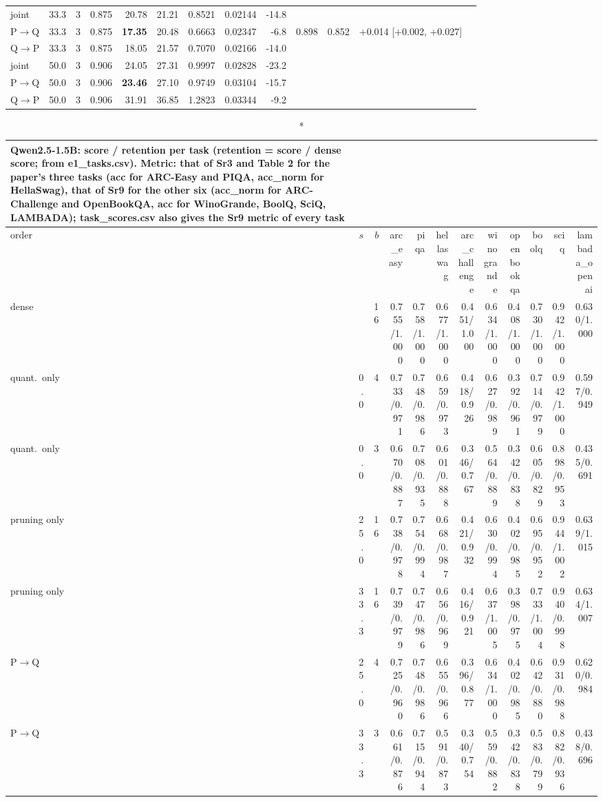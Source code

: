 \documentclass{article}
\begin{document}
\begin{longtable}{llrrrrrrrrrrl}
joint & 33.3 & 3 & 0.875 & 20.78 & 21.21 & 0.8521 & 0.02144 & -14.8 &  &  &  \\
P$\to$Q & 33.3 & 3 & 0.875 & \textbf{17.35} & 20.48 & 0.6663 & 0.02347 & -6.8 & 0.898 & 0.852 & +0.014 [+0.002, +0.027] \\
Q$\to$P & 33.3 & 3 & 0.875 & 18.05 & 21.57 & 0.7070 & 0.02166 & -14.0 &  &  &  \\
joint & 50.0 & 3 & 0.906 & 24.05 & 27.31 & 0.9997 & 0.02828 & -23.2 &  &  &  \\
P$\to$Q & 50.0 & 3 & 0.906 & \textbf{23.46} & 27.10 & 0.9749 & 0.03104 & -15.7 &  &  &  \\
Q$\to$P & 50.0 & 3 & 0.906 & 31.91 & 36.85 & 1.2823 & 0.03344 & -9.2 &  &  &  \\
\bottomrule\end{longtable}
\begin{longtable}{lrrrrrrrrrrr}
\caption*{Qwen2.5-1.5B: score / retention per task (retention = score / dense score; from e1\_tasks.csv). Metric: that of Sr3 and Table 2 for the paper's three tasks (acc for ARC-Easy and PIQA, acc\_norm for HellaSwag), that of Sr9 for the other six (acc\_norm for ARC-Challenge and OpenBookQA, acc for WinoGrande, BoolQ, SciQ, LAMBADA); task\_scores.csv also gives the Sr9 metric of every task}\\
\toprule order & $s$ & $b$ & arc\_easy & piqa & hellaswag & arc\_challenge & winogrande & openbookqa & boolq & sciq & lambada\_openai \\ \midrule \endhead
dense &  & 16 & 0.755/1.000 & 0.758/1.000 & 0.677/1.000 & 0.451/1.000 & 0.634/1.000 & 0.408/1.000 & 0.730/1.000 & 0.942/1.000 & 0.630/1.000 \\
quant.\ only & 0.0 & 4 & 0.733/0.971 & 0.748/0.986 & 0.659/0.973 & 0.418/0.926 & 0.627/0.989 & 0.392/0.961 & 0.714/0.979 & 0.942/1.000 & 0.597/0.949 \\
quant.\ only & 0.0 & 3 & 0.670/0.887 & 0.708/0.935 & 0.601/0.888 & 0.346/0.767 & 0.564/0.889 & 0.342/0.838 & 0.605/0.829 & 0.898/0.953 & 0.435/0.691 \\
pruning only & 25.0 & 16 & 0.738/0.978 & 0.754/0.994 & 0.668/0.987 & 0.421/0.932 & 0.630/0.994 & 0.402/0.985 & 0.695/0.952 & 0.944/1.002 & 0.639/1.015 \\
pruning only & 33.3 & 16 & 0.739/0.979 & 0.747/0.986 & 0.656/0.969 & 0.416/0.921 & 0.637/1.005 & 0.398/0.975 & 0.733/1.004 & 0.940/0.998 & 0.634/1.007 \\
P$\to$Q & 25.0 & 4 & 0.725/0.960 & 0.748/0.986 & 0.655/0.966 & 0.396/0.877 & 0.634/1.000 & 0.402/0.985 & 0.642/0.880 & 0.931/0.988 & 0.620/0.984 \\
P$\to$Q & 33.3 & 3 & 0.661/0.876 & 0.715/0.944 & 0.591/0.873 & 0.340/0.754 & 0.559/0.882 & 0.342/0.838 & 0.583/0.799 & 0.882/0.936 & 0.438/0.696 \\
\bottomrule\end{longtable}
\end{document}
